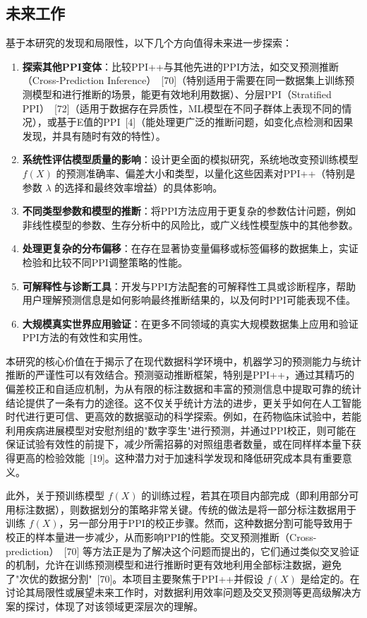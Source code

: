\documentclass[12pt,a4paper]{article}
\begin{document}
\subsection{未来工作}
\label{sec:future_work}
基于本研究的发现和局限性，以下几个方向值得未来进一步探索：
\begin{enumerate}
    \item \textbf{探索其他PPI变体}：比较PPI++与其他先进的PPI方法，如交叉预测推断（Cross-Prediction Inference）~{[70]}（特别适用于需要在同一数据集上训练预测模型和进行推断的场景，能更有效地利用数据）、分层PPI（Stratified PPI）~{[72]}（适用于数据存在异质性，ML模型在不同子群体上表现不同的情况），或基于E值的PPI~{[4]}（能处理更广泛的推断问题，如变化点检测和因果发现，并具有随时有效的特性）。
    \item \textbf{系统性评估模型质量的影响}：设计更全面的模拟研究，系统地改变预训练模型 $f(X)$ 的预测准确率、偏差大小和类型，以量化这些因素对PPI++（特别是参数 $\lambda$ 的选择和最终效率增益）的具体影响。
    \item \textbf{不同类型参数和模型的推断}：将PPI方法应用于更复杂的参数估计问题，例如非线性模型的参数、生存分析中的风险比，或广义线性模型族中的其他参数。
    \item \textbf{处理更复杂的分布偏移}：在存在显著协变量偏移或标签偏移的数据集上，实证检验和比较不同PPI调整策略的性能。
    \item \textbf{可解释性与诊断工具}：开发与PPI方法配套的可解释性工具或诊断程序，帮助用户理解预测信息是如何影响最终推断结果的，以及何时PPI可能表现不佳。
    \item \textbf{大规模真实世界应用验证}：在更多不同领域的真实大规模数据集上应用和验证PPI方法的有效性和实用性。
\end{enumerate}
本研究的核心价值在于揭示了在现代数据科学环境中，机器学习的预测能力与统计推断的严谨性可以有效结合。预测驱动推断框架，特别是PPI++，通过其精巧的偏差校正和自适应机制，为从有限的标注数据和丰富的预测信息中提取可靠的统计结论提供了一条有力的途径。这不仅关乎统计方法的进步，更关乎如何在人工智能时代进行更可信、更高效的数据驱动的科学探索。例如，在药物临床试验中，若能利用疾病进展模型对安慰剂组的"数字孪生"进行预测，并通过PPI校正，则可能在保证试验有效性的前提下，减少所需招募的对照组患者数量，或在同样样本量下获得更高的检验效能~{[19]}。这种潜力对于加速科学发现和降低研究成本具有重要意义。

此外，关于预训练模型 $f(X)$ 的训练过程，若其在项目内部完成（即利用部分可用标注数据），则数据划分的策略非常关键。传统的做法是将一部分标注数据用于训练 $f(X)$，另一部分用于PPI的校正步骤。然而，这种数据分割可能导致用于校正的样本量进一步减少，从而影响PPI的性能。交叉预测推断（Cross-prediction）~{[70]} 等方法正是为了解决这个问题而提出的，它们通过类似交叉验证的机制，允许在训练预测模型和进行推断时更有效地利用全部标注数据，避免了"次优的数据分割"~{[70]}。本项目主要聚焦于PPI++并假设 $f(X)$ 是给定的。在讨论其局限性或展望未来工作时，对数据利用效率问题及交叉预测等更高级解决方案的探讨，体现了对该领域更深层次的理解。
\end{document}
